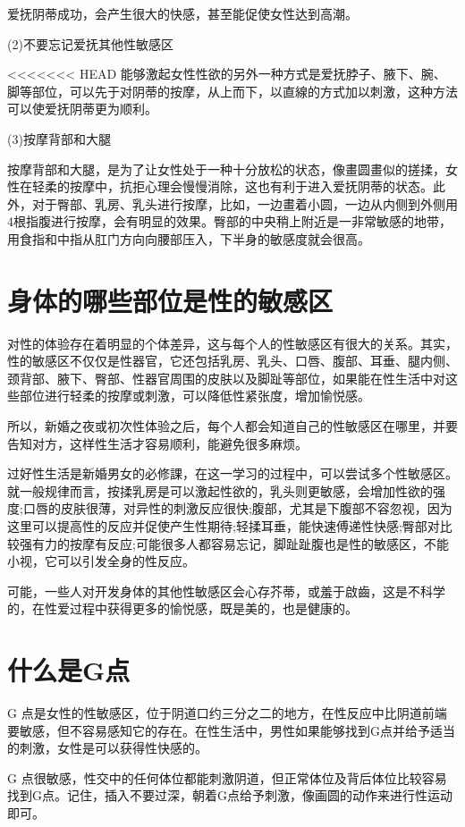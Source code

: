\documentclass[12pt,UTF8]{ctexbook}
\begin{document}
爱抚阴蒂成功，会产生很大的快感，甚至能促使女性达到高潮。

(2)不要忘记爱抚其他性敏感区

<<<<<<< HEAD
能够激起女性性欲的另外一种方式是爱抚脖子、腋下、腕、脚等部位，可以先于对阴蒂的按摩，从上而下，以直線的方式加以刺激，这种方法可以使爱抚阴蒂更为顺利。

(3)按摩背部和大腿

按摩背部和大腿，是为了让女性处于一种十分放松的状态，像畫圆畫似的搓揉，女性在轻柔的按摩中，抗拒心理会慢慢消除，这也有利于进入爱抚阴蒂的状态。此外，对于臀部、乳房、乳头进行按摩，比如，一边畫着小圆，一边从内侧到外侧用4根指腹进行按摩，会有明显的效果。臀部的中央稍上附近是一非常敏感的地带，用食指和中指从肛门方向向腰部压入，下半身的敏感度就会很高。

\section{身体的哪些部位是性的敏感区}

对性的体验存在着明显的个体差异，这与每个人的性敏感区有很大的关系。其实，性的敏感区不仅仅是性器官，它还包括乳房、乳头、口唇、腹部、耳垂、腿内侧、颈背部、腋下、臀部、性器官周围的皮肤以及脚趾等部位，如果能在性生活中对这些部位进行轻柔的按摩或刺激，可以降低性紧张度，增加愉悦感。

所以，新婚之夜或初次性体验之后，每个人都会知道自己的性敏感区在哪里，并要告知对方，这样性生活才容易顺利，能避免很多麻烦。

过好性生活是新婚男女的必修課，在这一学习的过程中，可以尝试多个性敏感区。就一般规律而言，按揉乳房是可以激起性欲的，乳头则更敏感，会增加性欲的强度;口唇的皮肤很薄，对异性的刺激反应很快;腹部，尤其是下腹部不容忽视，因为这里可以提高性的反应并促使产生性期待;轻揉耳垂，能快速傅递性快感;臀部对比较强有力的按摩有反应;可能很多人都容易忘记，脚趾趾腹也是性的敏感区，不能小视，它可以引发全身的性反应。

可能，一些人对开发身体的其他性敏感区会心存芥蒂，或羞于啟齒，这是不科学的，在性爱过程中获得更多的愉悦感，既是美的，也是健康的。

\section{什么是G点}

G 点是女性的性敏感区，位于阴道口约三分之二的地方，在性反应中比阴道前端要敏感，但不容易感知它的存在。在性生活中，男性如果能够找到G点并给予适当的刺激，女性是可以获得性快感的。

G 点很敏感，性交中的任何体位都能刺激阴道，但正常体位及背后体位比较容易找到G点。记住，插入不要过深，朝着G点给予刺激，像画圆的动作来进行性运动即可。
\end{document}
